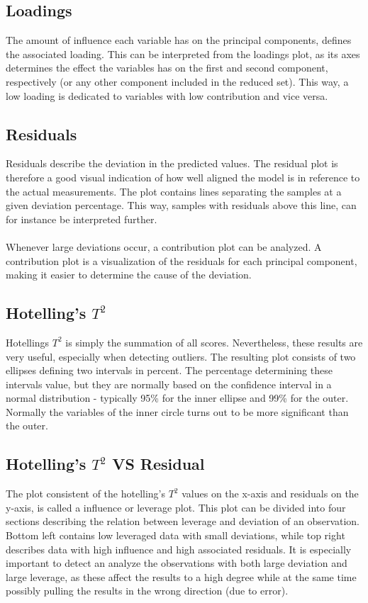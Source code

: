 \subsection{Loadings}
The amount of influence each variable has on the principal components, defines the associated loading. This can be interpreted from the loadings plot, as its axes determines the effect the variables has on the first and second component, respectively (or any other component included in the reduced set). This way, a low loading is dedicated to variables with low contribution and vice versa. 

\subsection{Residuals}
Residuals describe the deviation in the predicted values. The residual plot is therefore a good visual indication of how well aligned the model is in reference to the actual measurements. The plot contains lines separating the samples at a given deviation percentage. This way, samples with residuals above this line, can for instance be interpreted further.
\\\\
Whenever large deviations occur, a contribution plot can be analyzed. A contribution plot is a visualization of the residuals for each principal component, making it easier to determine the cause of the deviation. 

\subsection{Hotelling's $T^2$}
Hotellings $T^2$ is simply the summation of all scores. Nevertheless, these results are very useful, especially when detecting outliers. The resulting plot consists of two ellipses defining two intervals in percent. The percentage determining these intervals value, but they are normally based on the confidence interval in a normal distribution - typically 95\% for the inner ellipse and 99\% for the outer. Normally the variables of the inner circle turns out to be more significant than the outer. 

\subsection{Hotelling's $T^2$ VS Residual}
The plot consistent of the hotelling’s $T^2$ values on the x-axis and residuals on the y-axis, is called a influence or leverage plot. This plot can be divided into four sections describing the relation between leverage and deviation of an observation. Bottom left contains low leveraged data with small deviations, while top right describes data with high influence and high associated residuals. It is especially important to detect an analyze the observations with both large deviation and large leverage, as these affect the results to a high degree while at the same time possibly pulling the results in the wrong direction (due to error). 


